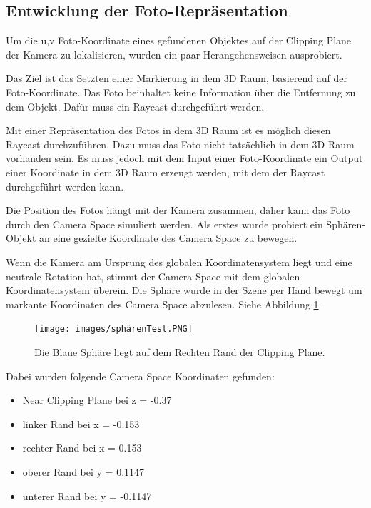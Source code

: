 \subsection{Entwicklung der Foto-Repräsentation}
\label{section:devpixeltoworld}

Um die u,v Foto-Koordinate eines gefundenen Objektes auf der Clipping Plane der Kamera zu lokalisieren, wurden ein paar Herangehensweisen ausprobiert.

Das Ziel ist das Setzten einer Markierung in dem 3D Raum, basierend auf der Foto-Koordinate. Das Foto beinhaltet keine Information über die Entfernung zu dem Objekt. Dafür muss ein Raycast durchgeführt werden. 

Mit einer Repräsentation des Fotos in dem 3D Raum ist es möglich diesen Raycast durchzuführen. 
Dazu muss das Foto nicht tatsächlich in dem 3D Raum vorhanden sein. Es muss jedoch mit dem Input einer Foto-Koordinate ein Output einer Koordinate in dem 3D Raum erzeugt werden, mit dem der Raycast durchgeführt werden kann.

Die Position des Fotos hängt mit der Kamera zusammen, daher kann das Foto durch den Camera Space simuliert werden. Als erstes wurde probiert ein Sphären-Objekt an eine gezielte Koordinate des Camera Space zu bewegen. 

Wenn die Kamera am Ursprung des globalen Koordinatensystem liegt und eine neutrale Rotation hat, stimmt der Camera Space mit dem globalen Koordinatensystem überein. Die Sphäre wurde in der Szene per Hand bewegt um markante Koordinaten des Camera Space abzulesen. Siehe Abbildung \ref{illustration:speretest}.

\begin{figure}[H]
	\centering
	\texttt{[image: images/sphärenTest.PNG]}
	\caption[]{Die Blaue Sphäre liegt auf dem Rechten Rand der Clipping Plane.}
	\label{illustration:speretest}
\end{figure}

Dabei wurden folgende Camera Space Koordinaten gefunden:
\begin{itemize}
	\item Near Clipping Plane bei z = -0.37
	\item linker Rand bei x = -0.153
	\item rechter Rand bei x = 0.153
	\item oberer Rand bei y = 0.1147
	\item unterer Rand bei y = -0.1147
\end{itemize}

